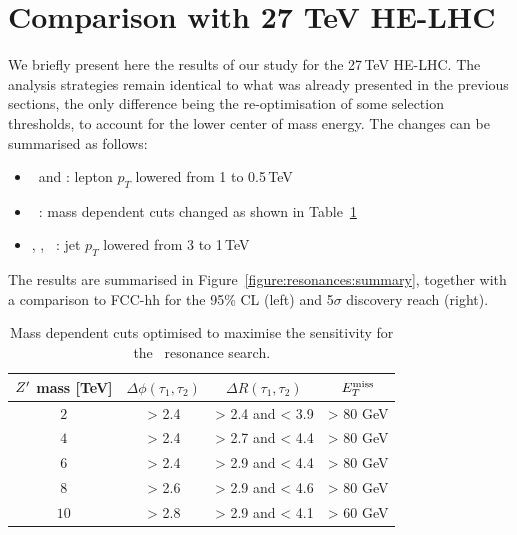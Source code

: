 \section{Comparison with 27 TeV HE-LHC}
\label{sec:ana27tev}
We briefly present here the results of our study for the 27\,TeV HE-LHC. The analysis strategies remain identical to what was already presented in the previous sections, the only difference being the re-optimisation of some selection thresholds, to account for the lower center of mass energy. The changes can be summarised as follows:
\begin{itemize}
\item \Zpee\ and \Zpmumu : lepton $p_T$ lowered from 1 to 0.5\,TeV
\item \Zptata\ : mass dependent cuts changed as shown in Table~\ref{tab:leptonicresonances:tautau27}
\item \rsg, \Zptt, \qjj\ : jet $p_T$ lowered from 3 to 1\,TeV
\end{itemize}
The results are summarised in Figure~\ref{figure:resonances:summary}, together with a comparison to FCC-hh for the 95\% CL (left) and 5$\sigma$ discovery reach (right).

\begin{table}[!htb]
   \centering
\begin{tabular}{c|c|c|c}
   $Z^{\prime}$ mass [TeV] &  $\Delta \phi(\tau_1, \tau_2)$&  $\Delta R(\tau_1, \tau_2)$ & $E_{T}^{\rm{miss}}$\\
  \hline
  \hline
   $2$ & > 2.4 & > 2.4 and < 3.9 & > 80 GeV\\
   $4$ & > 2.4 & > 2.7 and < 4.4 & > 80 GeV\\
   $6$ & > 2.4 & > 2.9 and < 4.4 & > 80 GeV\\
   $8$ & > 2.6 & > 2.9 and < 4.6 & > 80 GeV\\
  $10$ & > 2.8 & > 2.9 and < 4.1 & > 60 GeV\\
  \end{tabular}
  \caption{Mass dependent cuts optimised to maximise the sensitivity for the \Zptata\ resonance search.}
  \label{tab:leptonicresonances:tautau27}
\end{table}




